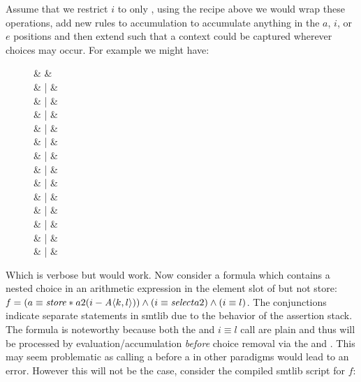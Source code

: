 Assume that we restrict $i$ to only , using the recipe above we would
wrap these operations, add new rules to accumulation to accumulate anything in
the $a$, $i$, or $e$ positions and then extend \zipper{} such that a context
could be captured wherever choices may occur. For example we might have:
%
\begin{figure}
  \centering
  \begin{syntax}
    \zipper & \Coloneqq{} & \inRoot  \\
    & | & \inNot{\zipper}            \\
    & | & \inUnary{\zipper}          \\
    & | & \inBoolL{\zipper}{\,\eIL}   \\
    & | &        \\
    & | & \inArithL{\zipper}{\,\eIL}  \\
    & | &       \\
    & | & \inInEqL{\zipper}{\,\eIL}   \\
    & | &        \\
    & | &  \\
    & | &  \\
    & | &  \\
    & | &  \\
    & | &  \\
  \end{syntax}
\end{figure}
%
Which is verbose but would work. Now consider a formula which contains a nested
choice in an arithmetic expression in the element slot of \select{} but not
store: $\kf{f} = (a \equiv \store*{a}{2}{(i - \chc[A]{k,l})}) \wedge (i \equiv
\select{a}{2}) \wedge (i \equiv l)$. The conjunctions indicate separate
statements in \acl{smtlib} due to the behavior of the assertion stack. The
formula is noteworthy because both the \select{} and $i \equiv l$ call are plain
and thus will be processed by evaluation/accumulation \emph{before} choice
removal via the \evAndL{} and \evAndR. This may seem problematic as calling a
\select{} before a \store{} in other paradigms would lead to an error. However
this will not be the case, consider the compiled \acl{smtlib} script for $f$:
% 
